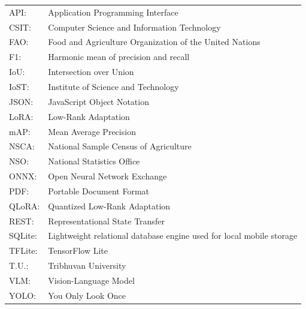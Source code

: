 
\begin{longtable}{@{}p{}p{}@{}}
API: & Application Programming Interface \\
CSIT: & Computer Science and Information Technology \\
FAO: & Food and Agriculture Organization of the United Nations \\
F1: & Harmonic mean of precision and recall \\
IoU: & Intersection over Union \\
IoST: & Institute of Science and Technology \\
JSON: & JavaScript Object Notation \\
LoRA: & Low-Rank Adaptation \\
mAP: & Mean Average Precision \\
NSCA: & National Sample Census of Agriculture \\
NSO: & National Statistics Office \\
ONNX: & Open Neural Network Exchange \\
PDF: & Portable Document Format \\
QLoRA: & Quantized Low-Rank Adaptation \\
REST: & Representational State Transfer \\
SQLite: & Lightweight relational database engine used for local mobile storage \\
TFLite: & TensorFlow Lite \\
T.U.: & Tribhuvan University \\
VLM: & Vision-Language Model \\
YOLO: & You Only Look Once \\
\end{longtable}
